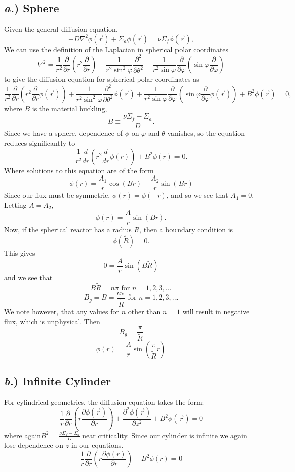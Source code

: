 \documentclass{article}
\newcommand{\p}{\partial}
\newcommand{\Xs}{\Sigma}
\newcommand{\pos}{\vec{r}}
\begin{document}
\subsection*{\textit{a.}) Sphere}
Given the general diffusion equation,
$$ -D \nabla^2 \phi(\pos) + \Xs_a \phi(\pos) = \nu \Xs_f\phi(\pos), $$
We can use the definition of the Laplacian in spherical polar coordinates 
$$ \nabla^2 = \frac{1}{r^2}\frac{\p}{\p r}\left( r^2 \frac{\p}{\p r}\right) + \frac{1}{r^2 \sin^2\varphi}\frac{\p^2}{\p \theta^2} + \frac{1}{r^2 \sin\varphi} \frac{\p}{\p \varphi}\left(\sin\varphi \frac{\p}{\p \varphi}\right) $$ 
to give the diffusion equation for spherical polar coordinates as
$$ \frac{1}{r^2}\frac{\p}{\p r}\left( r^2 \frac{\p}{\p r} \phi(\pos)\right) + \frac{1}{r^2 \sin^2\varphi}\frac{\p^2}{\p \theta^2} \phi(\pos) + \frac{1}{r^2 \sin\varphi} \frac{\p}{\p \varphi}\left(\sin\varphi \frac{\p}{\p \varphi}\phi(\pos)\right) + B^2 \phi(\pos) = 0 ,$$
where $B$ is the material buckling,
$$ B \equiv \frac{\nu \Xs_f - \Xs_a}{D} .$$
Since we have a sphere, dependence of $\phi$ on $\varphi$ and $\theta$ vanishes, so the equation reduces significantly to
$$ \frac{1}{r^2}\frac{d}{dr} \left( r^2 \frac{d}{dr} \phi(r)\right) + B^2 \phi(r) = 0 .$$
Where solutions to this equation are of the form 
$$ \phi(r) = \frac{A_1}{r}\cos(Br) + \frac{A_2}{r}\sin(Br)  $$
Since our flux must be symmetric, $\phi(r) = \phi(-r)$, and so we see that $A_1 = 0$. Letting $A = A_2$,
$$ \phi(r) = \frac{A}{r}\sin(Br) .$$
Now, if the spherical reactor has a radius $R$, then a boundary condition is
$$ \phi(\tilde{R}) = 0 .$$
This gives
$$ 0 = \frac{A}{r}\sin(B\tilde{R}) $$
and we see that 
$$ B\tilde{R} = n\pi \text{ for }n = 1,2,3, ...$$
$$ B_g = B = \frac{n\pi}{\tilde{R}} \text{ for }n = 1,2,3, ...$$
We note however, that any values for $n$ other than $n=1$ will result in negative flux, which is unphysical. Then
$$\boxed{ B_g = \frac{\pi}{\tilde{R}} }$$
$$\boxed{ \phi(r) = \frac{A}{r}\sin\left(\frac{\pi}{\tilde{R}}r \right) }$$

\subsection*{\textit{b.}) Infinite Cylinder}

For cylindrical geometries, the diffusion equation takes the form:
$$ \frac{1}{r}\frac{\p}{\p r}\left(r \frac{\p \phi(\pos)}{\p r}\right) + \frac{\p^2 \phi(\pos)}{\p z^2} + B^2\phi(\pos) = 0$$
where again$ B^2 = \frac{\nu\Sigma_f - \Sigma_a}{D} $ near criticality. 
Since our cylinder is infinite we again lose dependence on $z$ in our equations.
$$ \frac{1}{r}\frac{\p}{\p r}\left(r \frac{\p \phi(r)}{\p r}\right) + B^2\phi(r) = 0$$
\end{document}
